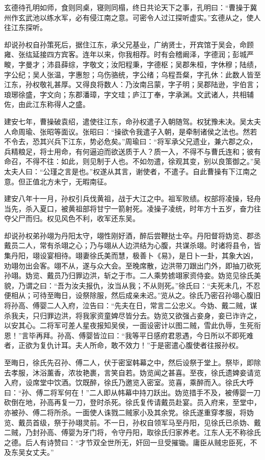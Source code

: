 玄德待孔明如师，食则同桌，寝则同榻，终日共论天下之事，孔明曰：“曹操于冀州作玄武池以练水军，必有侵江南之意。可密令人过江探听虚实。”玄德从之，使人往江东探听。

却说孙权自孙策死后，据住江东，承父兄基业，广纳贤士，开宾馆于吴会，命顾雍、张纮延接四方宾客。连年以来，你我相荐。时有会稽阚泽，字德润；彭城严畯，字曼才；沛县薛综，字敬文；汝阳程秉，字德枢；吴郡朱桓，字休穆；陆绩，字公纪；吴人张温，字惠恕；乌伤骆统，字公绪；乌程吾粲，字孔休：此数人皆至江东，孙权敬礼甚厚。又得良将数人：乃汝南吕蒙，字子明；吴郡陆逊，宇伯言；琅琊徐盛，字文向；东郡潘璋，字文珪；庐江丁奉，字承渊。文武诸人，共相辅佐，由此江东称得人之盛。

建安七年，曹操破袁绍，遣使往江东，命孙权遣子入朝随驾。权犹豫未决。吴太夫人命周瑜、张昭等面议。张昭曰：“操欲令我遣子入朝，是牵制诸侯之法也。然若不令去，恐其兴兵下江东，势必危矣。”周瑜曰：“将军承父兄遗业，兼六郡之众，兵精粮足，将士用命，有何逼迫而欲送质于人？质一入，不得不与曹氏连和；彼有命召，不得不往：如此，则见制于人也。不如勿遣，徐观其变，别以良策御之。”吴太夫人曰：“公瑾之言是也。”权遂从其言，谢使者，不遣子。自此曹操有下江南之意。但正值北方未宁，无暇南征。

建安八年十一月，孙权引兵伐黄祖，战于大江之中。祖军败绩。权部将凌操，轻舟当先，杀入夏口，被黄祖部将甘宁一箭射死。凌操子凌统，时年方十五岁，奋力往夺父尸而归。权见风色不利，收军还东吴。

却说孙权弟孙翊为丹阳太守，翊性刚好酒，醉后尝鞭挞士卒。丹阳督将妫览、郡丞戴员二人，常有杀翊之心；乃与翊从人边洪结为心腹，共谋杀翊。时诸将县令，皆集丹阳，翊设宴相待。翊妻徐氏美而慧，极善卜《易》，是日卜一卦，其象大凶，劝翊勿出会客。翊不从，遂与众大会。至晚席散，边洪带刀跟出门外，即抽刀砍死孙翊。妫览、戴员乃归罪边洪，斩之于市。二人乘势掳翊家资侍妾。妫览见徐氏美貌，乃谓之曰：“吾为汝夫报仇，汝当从我；不从则死。”徐氏曰：“夫死未几，不忍便相从；可待至晦日，设祭除服，然后成亲未迟。”览从之。徐氏乃密召孙翊心腹旧将孙高、傅婴二人入府，泣告曰：“先夫在日，常言二公忠义。今妫、戴二贼，谋杀我夫，只归罪边洪，将我家资童婢尽皆分去。妫览又欲强占妾身，妾已诈许之，以安其心。二将军可差人星夜报知吴侯，一面设密计以图二贼，雪此仇辱，生死衔恩！”言毕再拜。孙高、傅婴皆泣曰：“我等平日感府君恩遇，今日所以不即死难者，正欲为复仇计耳。夫人所命，敢不效力！”于是密遣心腹使者往报孙权。

至晦日，徐氏先召孙、傅二人，伏于密室韩幕之中，然后设祭于堂上。祭毕，即除去孝服，沐浴薰香，浓妆艳裹，言笑自若。妫览闻之甚喜。至夜，徐氏遗婢妾请览入府，设席堂中饮酒。饮既醉，徐氏乃邀览入密室。览喜，乘醉而入。徐氏大呼曰：“孙、傅二将军何在！”二人即从帏幕中持刀跃出。妫览措手不及，被傅婴一刀砍倒在地，孙高再复一刀，登时杀死。徐氏复传请戴员赴宴。员入府来，至堂中，亦被孙、傅二将所杀。一面使人诛戮二贼家小及其余党。徐氏遂重穿孝服，将妫览、戴员首级，祭于孙翊灵前。不一日，孙权自领军马至丹阳，见徐氏已杀妫、戴二贼，乃封孙高、傅婴为牙门将，令守丹阳，取徐氏归家养老。江东人无不称徐氏之德。后人有诗赞曰：“才节双全世所无，奸回一旦受摧锄。庸臣从贼忠臣死，不及东吴女丈夫。”

